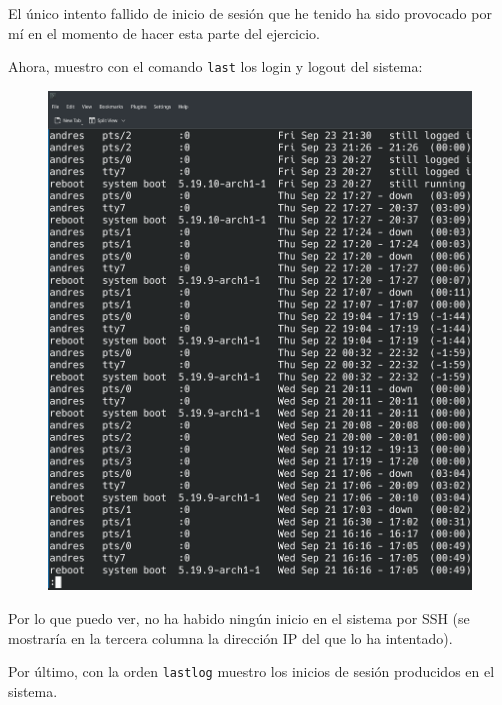 \documentclass{article}
\begin{document}
El único intento fallido de inicio de sesión que he tenido ha sido provocado por mí en el momento de hacer esta parte del ejercicio.

\newpage

Ahora, muestro con el comando \verb|last| los login y logout del sistema:

\begin{figure}[H]
    \includegraphics[width=\textwidth]{imagenes/lastcasa.png}
\end{figure}

Por lo que puedo ver, no ha habido ningún inicio en el sistema por SSH (se mostraría en la tercera columna la dirección IP del que lo ha intentado).

\newpage

Por último, con la orden \verb|lastlog| muestro los inicios de sesión producidos en el sistema.
\end{document}
